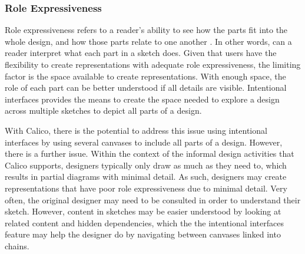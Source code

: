 \documentclass[12pt,fleqn]{ucithesis}
\begin{document}

\subsubsection{Role Expressiveness}

Role expressiveness refers to a reader's ability to see how the parts fit into the whole design, and how those parts relate to one another \cite{Petre2013BookChapter}. In other words, can a reader interpret what each part in a sketch does. Given that users have the flexibility to create representations with adequate role expressiveness, the limiting factor is the space available to create representations. With enough space, the role of each part can be better understood if all details are visible. Intentional interfaces provides the means to create the space needed to explore a design across multiple sketches to depict all parts of a design.

With Calico, there is the potential to address this issue using intentional interfaces by using several canvases to include all parts of a design. However, there is a further issue. Within the context of the informal design activities that Calico supports, designers typically only draw as much as they need to, which results in partial diagrams with minimal detail. As such, designers may create representations that have poor role expressiveness due to minimal detail. Very often, the original designer may need to be consulted in order to understand their sketch. However, content in sketches may be easier understood by looking at related content and hidden dependencies, which the the intentional interfaces feature may help the designer do by navigating between canvases linked into chains. 
\end{document}
